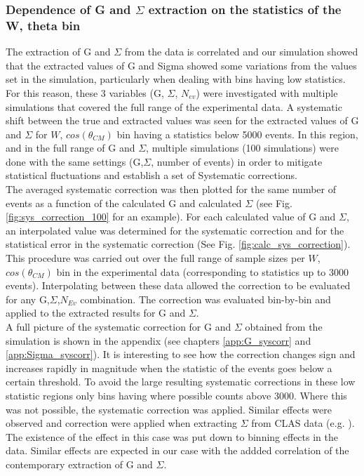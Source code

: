 \subsubsection{Dependence of G and \texorpdfstring{$\Sigma$}{Sigma} extraction on the  statistics of the W, theta bin}\label{sec:G_Sigma_sys}
The extraction of G and $\Sigma$ from the data is correlated and our simulation showed that the extracted values of G and Sigma showed some variations from the values set in the simulation, particularly when dealing with bins having low statistics.  For this reason, these 3 variables (G, $\Sigma$, $N_{ev}$) were investigated with multiple simulations that covered the full range of the experimental data. A systematic shift between the true and extracted values was seen for the extracted values of G and $\Sigma$ for $W$, $cos(\theta_{CM})$ bin having a statistics below 5000 events. In this region, and in the full range of G and $\Sigma$, multiple simulations (100 simulations) were done with the same settings (G,$\Sigma$, number of events) in order to mitigate statistical fluctuations and establish a set of Systematic corrections.  \\
The averaged systematic correction was then plotted for the same number of events as a function of the calculated G and calculated $\Sigma$ (see Fig. \ref{fig:sys_correction_100} for an example). For each calculated value of G and $\Sigma$, an interpolated value was determined for the systematic correction and for the statistical error in the systematic correction (See Fig. \ref{fig:calc_sys_correction}). 
This procedure was carried out over the full range of sample sizes per $W$, $cos(\theta_{CM})$ bin in the experimental data (corresponding to statistics up to 3000 events). Interpolating between these data allowed the correction to be evaluated for any G,$\Sigma$,$N_{Ev}$ combination. The correction was evaluated bin-by-bin and applied to the extracted results for G and $\Sigma$.  \\
A full picture of the systematic correction for G and $\Sigma$ obtained from the simulation is shown in the appendix (see chapters \ref{app:G_syscorr} and \ref{app:Sigma_syscorr}). It is interesting to see how the correction changes sign and increases rapidly in magnitude when the statistic of the events goes below a certain threshold. To avoid the large resulting systematic corrections in these low statistic regions only bins having where possible counts above 3000. Where this was not possible, the systematic correction was applied. 
Similar effects were observed and correction were applied when extracting $\Sigma$ from CLAS data (e.g. \cite{Zacha_2017}). The existence of the effect in this case was put down to binning effects in the data. Similar effects are expected in our case with the addded correlation of the contemporary extraction of G and $\Sigma$.
